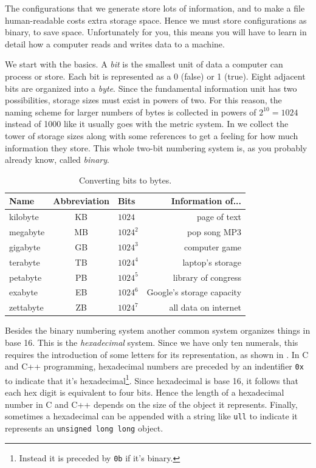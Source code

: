 The configurations that we generate store lots of information, and to make a
file human-readable costs extra storage space. Hence we must store
configurations as binary, to save space. Unfortunately for you,
this means you will have to learn in detail how a computer reads and writes data
to a machine.

We start with the basics. A {\it bit} is the smallest unit of data a computer
can process or store. Each bit is represented as a 0 (false) or 1 (true).
Eight adjacent bits are organized into a {\it byte}.
Since the fundamental information unit has two possibilities, storage
sizes must exist in powers of two. For this reason, the naming scheme
for larger numbers of bytes is collected in powers of $2^{10}=1024$
instead of 1000 like it usually goes with the metric system.
In  we collect the tower of storage sizes
along with some references to get a feeling for how much information
they store. This whole two-bit numbering system is, as you probably
already know, called {\it binary}.

\begin{table}
\centering
\caption{Converting bits to bytes.}
\begin{tabularx}{\linewidth}{lCLr}
\hline\hline
Name & Abbreviation & Bits & Information of...\\
\hline
kilobyte & KB & $1024$ & page of text \\
megabyte & MB & $1024^2$ & pop song MP3 \\
gigabyte & GB & $1024^3$ & computer game \\
terabyte & TB & $1024^4$ & laptop's storage \\
petabyte & PB & $1024^5$ & library of congress \\
exabyte  & EB & $1024^6$ & Google's storage capacity \\
zettabyte  & ZB & $1024^7$ & all data on internet \\
\hline\hline
\end{tabularx}
\label{tab:byte}
\end{table}

Besides the binary numbering system another common system organizes things in
base 16. This is the {\it hexadecimal} system. Since we have only ten numerals,
this requires the introduction of some letters for its representation,
as shown in . In C and C++ programming,
hexadecimal numbers are preceded by an indentifier \texttt{0x} to
indicate that it's hexadecimal\footnote{Instead it is preceded
by \texttt{0b} if it's binary.}.
Since hexadecimal is base 16, it follows that each hex digit is equivalent
to four bits. Hence the length of a hexadecimal number in C and C++
depends on the size of the object it represents. Finally, sometimes
a hexadecimal can be appended with a string like \texttt{ull} to
indicate it represents an \texttt{unsigned long long} object. 

